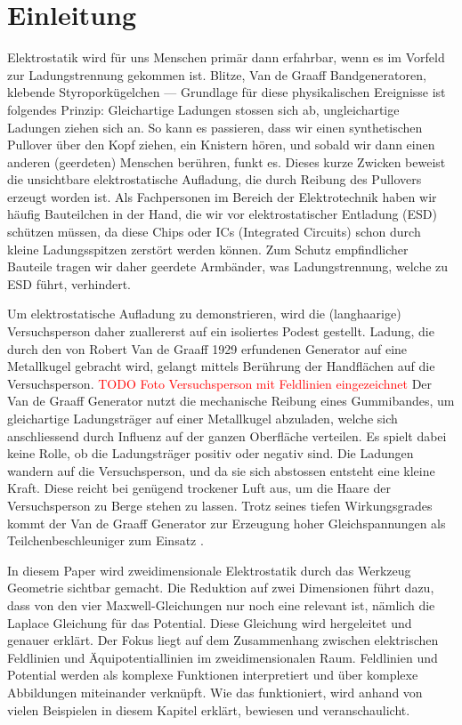 %
%
%
%

\section{Einleitung}
Elektrostatik wird für uns Menschen primär dann erfahrbar, wenn es im Vorfeld zur Ladungstrennung gekommen ist.
Blitze, Van de Graaff Bandgeneratoren, klebende Styroporkügelchen --- Grundlage für diese physikalischen Ereignisse ist folgendes Prinzip:
Gleichartige Ladungen stossen sich ab, ungleichartige Ladungen ziehen sich an.
So kann es passieren, dass wir einen synthetischen Pullover über den Kopf ziehen, ein Knistern hören, und sobald wir dann einen anderen (geerdeten) Menschen berühren, funkt es.
Dieses kurze Zwicken beweist die unsichtbare elektrostatische Aufladung, die durch Reibung des Pullovers erzeugt worden ist.
Als Fachpersonen im Bereich der Elektrotechnik haben wir häufig Bauteilchen in der Hand, die wir vor elektrostatischer Entladung (ESD) schützen müssen, da diese Chips oder ICs (Integrated Circuits) schon durch kleine Ladungsspitzen zerstört werden können.
Zum Schutz empfindlicher Bauteile tragen wir daher geerdete Armbänder, was Ladungstrennung, welche zu ESD führt, verhindert. 

Um elektrostatische Aufladung zu demonstrieren, wird die (langhaarige) Versuchsperson daher zuallererst auf ein isoliertes Podest gestellt.
Ladung, die durch den von Robert Van de Graaff 1929 erfundenen Generator auf eine Metallkugel gebracht wird, gelangt mittels Berührung der Handflächen auf die Versuchsperson.
\textcolor{red}{TODO Foto Versuchsperson mit Feldlinien eingezeichnet}
Der Van de Graaff Generator nutzt die mechanische Reibung eines Gummibandes, um gleichartige Ladungsträger auf einer Metallkugel abzuladen, welche sich anschliessend durch Influenz auf der ganzen Oberfläche verteilen.
Es spielt dabei keine Rolle, ob die Ladungsträger positiv oder negativ sind.
Die Ladungen wandern auf die Versuchsperson, und da sie sich abstossen entsteht eine kleine Kraft.
Diese reicht bei genügend trockener Luft aus, um die Haare der Versuchsperson zu Berge stehen zu lassen.
Trotz seines tiefen Wirkungsgrades kommt der Van de Graaff Generator zur Erzeugung hoher Gleichspannungen als Teilchenbeschleuniger zum Einsatz \cite{elektro:lexikon}.

In diesem Paper wird zweidimensionale Elektrostatik durch das Werkzeug Geometrie sichtbar gemacht.
Die Reduktion auf zwei Dimensionen führt dazu, dass von den vier Maxwell-Gleichungen nur noch eine relevant ist, nämlich die Laplace Gleichung für das Potential. 
Diese Gleichung wird hergeleitet und genauer erklärt.
Der Fokus liegt auf dem Zusammenhang zwischen elektrischen Feldlinien und Äquipotentiallinien im zweidimensionalen Raum.
Feldlinien und Potential werden als komplexe Funktionen interpretiert und über komplexe Abbildungen miteinander verknüpft.
Wie das funktioniert, wird anhand von vielen Beispielen in diesem Kapitel erklärt, bewiesen und veranschaulicht. 



